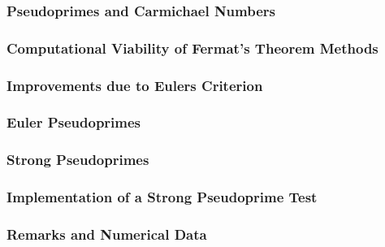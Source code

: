 \documentclass{article}
\begin{document}
\subsubsection{Pseudoprimes and Carmichael Numbers}


\subsubsection{Computational Viability of Fermat's Theorem Methods}

\subsubsection{Improvements due to Eulers Criterion}

\subsubsection{Euler Pseudoprimes}

\subsubsection{Strong Pseudoprimes}

\subsubsection{Implementation of a Strong Pseudoprime Test}

\subsubsection{Remarks and Numerical Data}

\end{document}
